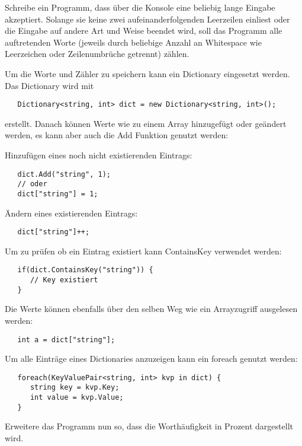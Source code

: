 
Schreibe ein Programm, dass über die Konsole eine beliebig lange Eingabe akzeptiert. Solange
sie keine zwei aufeinanderfolgenden Leerzeilen einliest oder die Eingabe auf andere Art und Weise
beendet wird, soll das Programm alle auftretenden Worte (jeweils durch beliebige Anzahl an
Whitespace wie Leerzeichen oder Zeilenumbrüche getrennt) zählen.

Um die Worte und Zähler zu speichern kann ein Dictionary eingesetzt werden. Das Dictionary wird mit

\begin{lstlisting}
   Dictionary<string, int> dict = new Dictionary<string, int>();
\end{lstlisting}

erstellt. Danach können Werte wie zu einem Array hinzugefügt oder geändert werden, es kann aber auch
die Add Funktion genutzt werden:

Hinzufügen eines noch nicht existierenden Eintrags:
\begin{lstlisting}
   dict.Add("string", 1);
   // oder
   dict["string"] = 1;
\end{lstlisting}

Ändern eines existierenden Eintrags:
\begin{lstlisting}
   dict["string"]++;
\end{lstlisting}

Um zu prüfen ob ein Eintrag existiert kann ContainsKey verwendet werden:

\begin{lstlisting}
   if(dict.ContainsKey("string")) {
      // Key existiert
   }
\end{lstlisting}

Die Werte können ebenfalls über den selben Weg wie ein Arrayzugriff ausgelesen werden:

\begin{lstlisting}
   int a = dict["string"];
\end{lstlisting}

Um alle Einträge eines Dictionaries anzuzeigen kann ein foreach genutzt werden:

\begin{lstlisting}
   foreach(KeyValuePair<string, int> kvp in dict) {
      string key = kvp.Key;
      int value = kvp.Value;
   }
\end{lstlisting}

Erweitere das Programm nun so, dass die Worthäufigkeit in Prozent dargestellt wird.